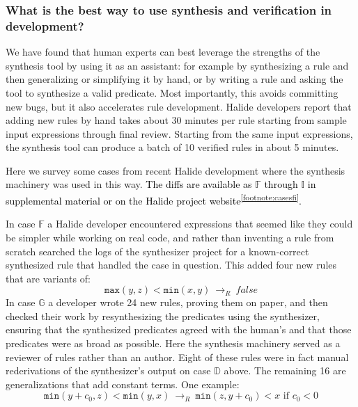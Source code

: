 \documentclass[acmsmall,review]{acmart}\settopmatter{printfolios=true,printccs=false,printacmref=false}
\newcommand{\modified}[1]{\textcolor{black}{{#1}}}
\newcommand{\hmax}[0]{\texttt{max}}
\newcommand{\hmin}[0]{\texttt{min}}
\newcommand{\rewrites}[0]{\:\rightarrow_{R}\:}
\newcommand{\pred}[0]{\textrm{ if }}
\begin{document}
\subsubsection{What is the best way to use synthesis and verification in development?}
\label{sub:synthassistant}


We have found that human experts can best leverage the strengths of the synthesis tool by using it as an assistant: for example by synthesizing a rule and then generalizing or simplifying it by hand, or by writing a rule and asking the tool to synthesize a valid predicate. Most importantly, this avoids committing new bugs, but it also accelerates rule development. Halide developers report that adding new rules by hand takes about 30 minutes per rule starting from sample input expressions through final review. Starting from the same input expressions, the synthesis tool can produce a batch of 10 verified rules in about 5 minutes.

Here we survey some cases from recent Halide development where the synthesis machinery was used in this way. \modified{The diffs are available as $\mathbb{F}$ through $\mathbb{I}$ in supplemental material or on the Halide project website\textsuperscript{\ref{footnote:casesfi}}.}

In case $\mathbb{F}$ a Halide developer encountered expressions that seemed like they could be simpler while working on real code, and rather than inventing a rule from scratch searched the logs of the synthesizer project for a known-correct synthesized rule that handled the case in question. This added four new rules that are variants of:
\[
\hmax(y, z) < \hmin(x, y) \rewrites \mathit{false}
\]
In case $\mathbb{G}$ a developer wrote 24 new rules, proving them on paper, and then checked their work by resynthesizing the predicates using the synthesizer, ensuring that the synthesized predicates agreed with the human’s and that those predicates were as broad as possible. Here the synthesis machinery served as a reviewer of rules rather than an author. Eight of these rules were in fact manual rederivations of the synthesizer’s output on case $\mathbb{D}$ above. The remaining 16 are generalizations that add constant terms. One example:
\[
\hmin(y + c_0, z) < \hmin(y, x) \rewrites \hmin(z, y + c_0) < x \pred c_0 < 0
\]
\end{document}
